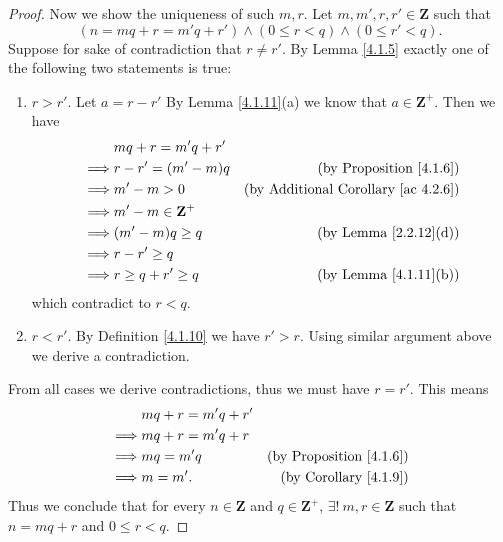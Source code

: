 \begin{proof}
    Now we show the uniqueness of such \(m, r\).
    Let \(m, m', r, r' \in \mathbf{Z}\) such that
    \[
        (n = mq + r = m'q + r') \land (0 \leq r < q) \land (0 \leq r' < q).
    \]
    Suppose for sake of contradiction that \(r \neq r'\).
    By Lemma \ref{4.1.5} exactly one of the following two statements is true:
    \begin{enumerate}
        \item \(r > r'\).
              Let \(a = r - r'\)
              By Lemma \ref{4.1.11}(a) we know that \(a \in \mathbf{Z}^+\).
              Then we have
              \begin{align*}
                           & mq + r = m'q + r'                                                         \\
                  \implies & r - r' = (m' - m)q      & \text{(by Proposition \ref{4.1.6})}             \\
                  \implies & m' - m > 0              & \text{(by Additional Corollary \ref{ac 4.2.6})} \\
                  \implies & m' - m \in \mathbf{Z}^+                                                   \\
                  \implies & (m' - m)q \geq q        & \text{(by Lemma \ref{2.2.12}(d))}               \\
                  \implies & r - r' \geq q                                                             \\
                  \implies & r \geq q + r' \geq q    & \text{(by Lemma \ref{4.1.11}(b))}
              \end{align*}
              which contradict to \(r < q\).
        \item \(r < r'\).
              By Definition \ref{4.1.10} we have \(r' > r\).
              Using similar argument above we derive a contradiction.
    \end{enumerate}
    From all cases we derive contradictions, thus we must have \(r = r'\).
    This means
    \begin{align*}
                 & mq + r = m'q + r'                                       \\
        \implies & mq + r = m'q + r                                        \\
        \implies & mq = m'q          & \text{(by Proposition \ref{4.1.6})} \\
        \implies & m = m'.           & \text{(by Corollary \ref{4.1.9})}
    \end{align*}
    Thus we conclude that for every \(n \in \mathbf{Z}\) and \(q \in \mathbf{Z}^+\), \(\exists!\ m, r \in \mathbf{Z}\) such that \(n = mq + r\) and \(0 \leq r < q\).
\end{proof}

